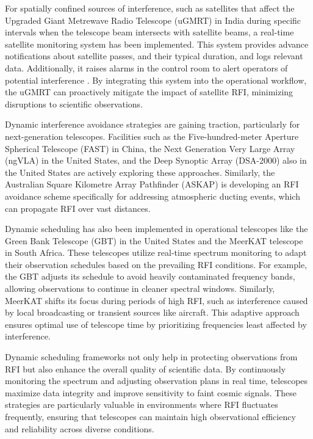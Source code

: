 For spatially confined sources of interference, such as satellites that affect the Upgraded Giant Metrewave Radio Telescope (uGMRT) in India during specific intervals when the telescope beam intersects with satellite beams, a real-time satellite monitoring system has been implemented. This system provides advance notifications about satellite passes, and their typical duration, and logs relevant data. Additionally, it raises alarms in the control room to alert operators of potential interference \citep{raybole2016real}. By integrating this system into the operational workflow, the uGMRT can proactively mitigate the impact of satellite RFI, minimizing disruptions to scientific observations.

Dynamic interference avoidance strategies are gaining traction, particularly for next-generation telescopes. Facilities such as the Five-hundred-meter Aperture Spherical Telescope (FAST) in China, the Next Generation Very Large Array (ngVLA) in the United States, and the Deep Synoptic Array (DSA-2000) also in the United States are actively exploring these approaches. Similarly, the Australian Square Kilometre Array Pathfinder (ASKAP) is developing an RFI avoidance scheme specifically for addressing atmospheric ducting events, which can propagate RFI over vast distances.

Dynamic scheduling has also been implemented in operational telescopes like the Green Bank Telescope (GBT) in the United States and the MeerKAT telescope in South Africa. These telescopes utilize real-time spectrum monitoring to adapt their observation schedules based on the prevailing RFI conditions. For example, the GBT adjusts its schedule to avoid heavily contaminated frequency bands, allowing observations to continue in cleaner spectral windows. Similarly, MeerKAT shifts its focus during periods of high RFI, such as interference caused by local broadcasting or transient sources like aircraft. This adaptive approach ensures optimal use of telescope time by prioritizing frequencies least affected by interference.

Dynamic scheduling frameworks not only help in protecting observations from RFI but also enhance the overall quality of scientific data. By continuously monitoring the spectrum and adjusting observation plans in real time, telescopes maximize data integrity and improve sensitivity to faint cosmic signals. These strategies are particularly valuable in environments where RFI fluctuates frequently, ensuring that telescopes can maintain high observational efficiency and reliability across diverse conditions.

